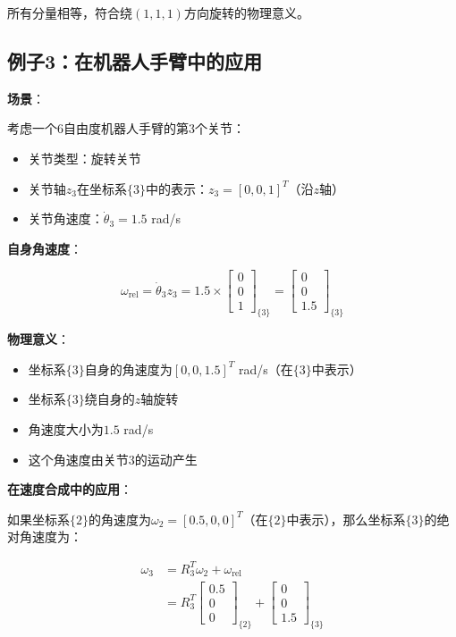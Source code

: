 \documentclass[12pt,a4paper]{article}
\begin{document}
所有分量相等，符合绕$(1,1,1)$方向旋转的物理意义。

\subsection{例子3：在机器人手臂中的应用}

\textbf{场景}：

考虑一个6自由度机器人手臂的第3个关节：
\begin{itemize}
\item 关节类型：旋转关节
\item 关节轴$z_3$在坐标系$\{3\}$中的表示：$z_3 = [0, 0, 1]^T$（沿$z$轴）
\item 关节角速度：$\dot{\theta}_3 = 1.5$ rad/s
\end{itemize}

\textbf{自身角速度}：

\begin{equation}
\omega_{\text{rel}} = \dot{\theta}_3 z_3 = 1.5 \times \begin{bmatrix} 0 \\ 0 \\ 1 \end{bmatrix}_{\{3\}} = \begin{bmatrix} 0 \\ 0 \\ 1.5 \end{bmatrix}_{\{3\}}
\end{equation}

\textbf{物理意义}：
\begin{itemize}
\item 坐标系$\{3\}$自身的角速度为$[0, 0, 1.5]^T$ rad/s（在$\{3\}$中表示）
\item 坐标系$\{3\}$绕自身的$z$轴旋转
\item 角速度大小为$1.5$ rad/s
\item 这个角速度由关节3的运动产生
\end{itemize}

\textbf{在速度合成中的应用}：

如果坐标系$\{2\}$的角速度为$\omega_2 = [0.5, 0, 0]^T$（在$\{2\}$中表示），那么坐标系$\{3\}$的绝对角速度为：

\begin{align}
\omega_3 &= R_3^T \omega_2 + \omega_{\text{rel}} \\
&= R_3^T \begin{bmatrix} 0.5 \\ 0 \\ 0 \end{bmatrix}_{\{2\}} + \begin{bmatrix} 0 \\ 0 \\ 1.5 \end{bmatrix}_{\{3\}}
\end{align}
\end{document}
